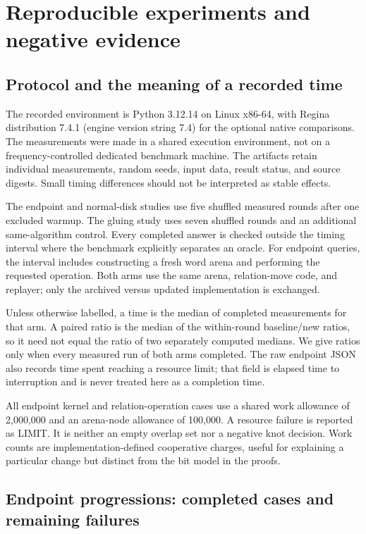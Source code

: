 \section{Reproducible experiments and negative evidence}
\label{sec:experiments}

\subsection{Protocol and the meaning of a recorded time}

The recorded environment is Python 3.12.14 on Linux x86-64, with
Regina distribution 7.4.1 (engine version string 7.4) for the optional native
comparisons. The measurements were made in a shared execution environment,
not on a frequency-controlled dedicated benchmark machine. The artifacts
retain individual measurements, random seeds, input data, result status,
and source digests. Small timing differences should not be interpreted as
stable effects.

The endpoint and normal-disk studies use five shuffled measured rounds after
one excluded warmup. The gluing study uses seven shuffled rounds and an
additional same-algorithm control. Every completed answer is checked outside
the timing interval where the benchmark explicitly separates an oracle.
For endpoint queries, the interval includes constructing a fresh word arena
and performing the requested operation. Both arms use the same arena,
relation-move code, and replayer; only the archived versus updated
 implementation is exchanged.

Unless otherwise labelled, a time is the median of completed measurements
for that arm. A paired ratio is the median of the within-round baseline/new
ratios, so it need not equal the ratio of two separately computed medians.
We give ratios only when every measured run of both arms completed. The raw
endpoint JSON also records time spent reaching a resource limit; that field
is elapsed time to interruption and is never treated here as a completion
time.

All endpoint kernel and relation-operation cases use a shared work allowance
of 2,000,000 and an arena-node allowance of 100,000. A resource failure is
reported as LIMIT. It is neither an empty overlap set nor a negative knot
decision. Work counts are implementation-defined cooperative charges, useful
for explaining a particular change but distinct from the bit model in the
proofs.

\subsection{Endpoint progressions: completed cases and remaining failures}

